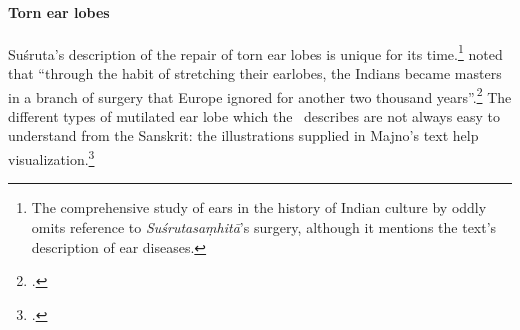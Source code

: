 
%



\paragraph{Torn ear lobes}

Suśruta's description of the repair of torn ear lobes is  unique for
its time.\footnote{The comprehensive study of ears in the history of Indian culture 
by \citet{boll-2010} oddly omits reference to \emph{Suśrutasaṃhitā}'s surgery, 
although it mentions the text's description of ear diseases.}  
\citeauthor{majn-1975} noted that “through the habit of
stretching their earlobes, the Indians became masters in a branch of surgery
that Europe ignored for another two thousand years”.\footcite[291]{majn-1975}  
The different types of
mutilated ear lobe which the \SS\ describes are not always easy to understand
from the Sanskrit: the illustrations supplied in Majno's text help
visualization.\footcites[290--291]{majn-1975}[reproduced with permission 
in][92--93]{wuja-2003}


